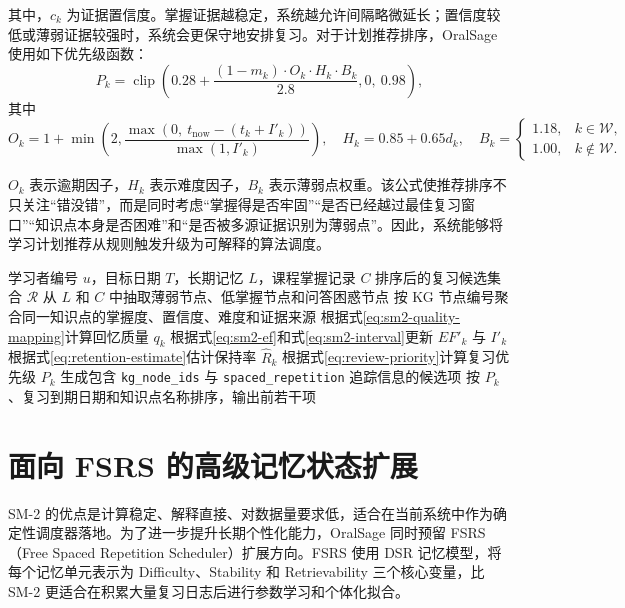 其中，$c_k$ 为证据置信度。掌握证据越稳定，系统越允许间隔略微延长；置信度较低或薄弱证据较强时，系统会更保守地安排复习。对于计划推荐排序，OralSage 使用如下优先级函数：
\begin{equation}
  P_k=\operatorname{clip}\left(
  0.28+
  \frac{(1-m_k)\cdot O_k\cdot H_k\cdot B_k}{2.8},
  0,\ 0.98
  \right),
  \label{eq:review-priority}
\end{equation}
其中
\begin{equation}
  O_k=1+\min\left(2,\frac{\max(0,\ t_{\mathrm{now}}-(t_k+I'_k))}{\max(1,I'_k)}\right),
  \quad
  H_k=0.85+0.65d_k,
  \quad
  B_k =
  \begin{cases}
  1.18, & k\in \mathcal{W},\\
  1.00, & k\notin \mathcal{W}.
  \end{cases}
\end{equation}

$O_k$ 表示逾期因子，$H_k$ 表示难度因子，$B_k$ 表示薄弱点权重。该公式使推荐排序不只关注“错没错”，而是同时考虑“掌握得是否牢固”“是否已经越过最佳复习窗口”“知识点本身是否困难”和“是否被多源证据识别为薄弱点”。因此，系统能够将学习计划推荐从规则触发升级为可解释的算法调度。

\begin{algorithm}[H]
  \caption{面向 KG 节点的 SM-2 复习调度}
  \label{alg:kg-sm2-review}
  \begin{algorithmic}[1]
    \Require 学习者编号 $u$，目标日期 $T$，长期记忆 $L$，课程掌握记录 $C$
    \Ensure 排序后的复习候选集合 $\mathcal{R}$
    \State 从 $L$ 和 $C$ 中抽取薄弱节点、低掌握节点和问答困惑节点
    \State 按 KG 节点编号聚合同一知识点的掌握度、置信度、难度和证据来源
      \State 根据式\eqref{eq:sm2-quality-mapping}计算回忆质量 $q_k$
      \State 根据式\eqref{eq:sm2-ef}和式\eqref{eq:sm2-interval}更新 $EF'_k$ 与 $I'_k$
      \State 根据式\eqref{eq:retention-estimate}估计保持率 $\hat R_k$
      \State 根据式\eqref{eq:review-priority}计算复习优先级 $P_k$
      \State 生成包含 \texttt{kg\_node\_ids} 与 \texttt{spaced\_repetition} 追踪信息的候选项
    \EndFor
    \State 按 $P_k$、复习到期日期和知识点名称排序，输出前若干项
  \end{algorithmic}
\end{algorithm}

\section{面向 FSRS 的高级记忆状态扩展}

SM-2 的优点是计算稳定、解释直接、对数据量要求低，适合在当前系统中作为确定性调度器落地。为了进一步提升长期个性化能力，OralSage 同时预留 FSRS（Free Spaced Repetition Scheduler）扩展方向。FSRS 使用 DSR 记忆模型，将每个记忆单元表示为 Difficulty、Stability 和 Retrievability 三个核心变量\cite{openfsrs2025algorithm}，比 SM-2 更适合在积累大量复习日志后进行参数学习和个体化拟合。

